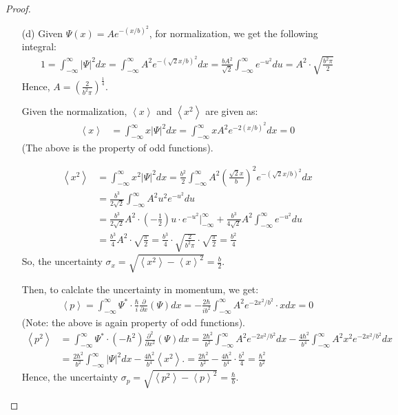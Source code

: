\documentclass{article}
\begin{document}
\begin{proof}
\begin{itemize}
        \item[(d)] Given $\Psi(x)=Ae^{-(x/b)^2}$, for normalization, we get the following integral:
        \begin{align}
            1=\int_{-\infty}^{\infty}|\Psi|^2dx = \int_{-\infty}^{\infty}A^2e^{-(\sqrt{2}x/b)^2}dx = \frac{bA^2}{\sqrt{2}}\int_{-\infty}^{\infty}e^{-u^2}du = A^2\cdot \sqrt{\frac{b^2\pi}{2}}
        \end{align}
        Hence, $A=\left(\frac{2}{b^2\pi}\right)^\frac{1}{4}$.

        \hfil

        Given the normalization, $\left<x\right>$ and $\left<x^2\right>$ are given as:
        \begin{align}
            \left<x\right>&=\int_{-\infty}^{\infty}x|\Psi|^2dx = \int_{-\infty}^{\infty}xA^2e^{-2(x/b)^2}dx = 0
        \end{align}
        (The above is the property of odd functions).

        \begin{align}
            \left<x^2\right>&=\int_{-\infty}^{\infty}x^2|\Psi|^2dx = \frac{b^2}{2}\int_{-\infty}^{\infty}A^2\left(\frac{\sqrt{2}x}{b}\right)^2e^{-(\sqrt{2}x/b)^2}dx\\
            &= \frac{b^3}{2\sqrt{2}}\int_{-\infty}^{\infty}A^2 u^2e^{-u^2}du\\\
            &= \frac{b^3}{2\sqrt{2}}A^2\cdot\left(-\frac{1}{2}\right)u\cdot e^{-u^2}\bigg|_{-\infty}^{\infty}+\frac{b^3}{4\sqrt{2}}A^2\int_{-\infty}^{\infty}e^{-u^2}du\\
            &= \frac{b^3}{4}A^2\cdot\sqrt{\frac{\pi}{2}}=\frac{b^3}{4}\cdot\sqrt{\frac{2}{b^2\pi}}\cdot\sqrt{\frac{\pi}{2}}=\frac{b^2}{4}
        \end{align}
        So, the uncertainty $\sigma_x=\sqrt{\left<x^2\right>-\left<x\right>^2}=\frac{b}{2}$.

        \hfil

        Then, to calclate the uncertainty in momentum, we get:
        \begin{align}
            \left<p\right>=\int_{-\infty}^{\infty}\Psi^*\cdot \frac{\hbar}{i}\frac{\partial}{\partial x}(\Psi) dx = -\frac{2\hbar}{ib^2}\int_{-\infty}^{\infty}A^2e^{-2x^2/b^2}\cdot x dx = 0
        \end{align}
        (Note: the above is again property of odd functions).
        \begin{align}
            \left<p^2\right>&=\int_{-\infty}^{\infty}\Psi^*\cdot(-\hbar^2)\frac{\partial^2}{\partial x^2}(\Psi)dx = \frac{2\hbar^2}{b^2}\int_{-\infty}^{\infty}A^2e^{-2x^2/b^2}dx - \frac{4\hbar^2}{b^4}\int_{-\infty}^{\infty}A^2x^2e^{-2x^2/b^2}dx\\
            &= \frac{2\hbar^2}{b^2}\int_{-\infty}^{\infty}|\Psi|^2dx - \frac{4\hbar^2}{b^4}\left<x^2\right>. = \frac{2\hbar^2}{b^2}-\frac{4\hbar^2}{b^4}\cdot \frac{b^2}{4} = \frac{\hbar^2}{b^2}
        \end{align}
        Hence, the uncertainty $\sigma_p=\sqrt{\left<p^2\right>-\left<p\right>^2} = \frac{\hbar}{b}$.


\end{itemize}
\end{proof}
\end{document}
